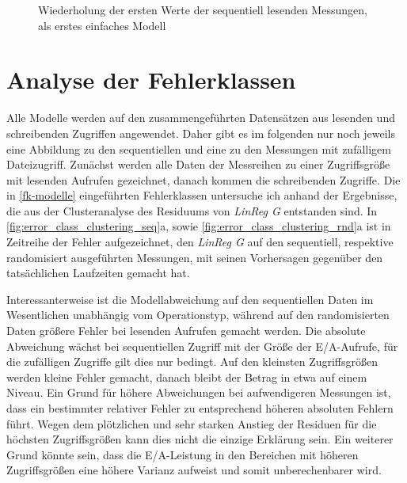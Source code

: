 \documentclass[
	12pt,
	a4paper,
	BCOR10mm,
	DIV14,
	listof=totoc,
	bibliography=totoc,
	headsepline
]{scrreprt}
\begin{document}
\begin{figure}
	\caption{Wiederholung der ersten Werte der sequentiell lesenden Messungen, als erstes einfaches Modell}
	\label{fig:periodicity100001}
\end{figure} 
\clearpage

\section{Analyse der Fehlerklassen}
\label{fk_analyse}
Alle Modelle werden auf den zusammengeführten Datensätzen aus lesenden und schreibenden Zugriffen angewendet. Daher gibt es im folgenden nur noch jeweils eine Abbildung zu den sequentiellen und eine zu den Messungen mit zufälligem Dateizugriff.
Zunächst werden alle Daten der Messreihen zu einer Zugriffsgröße mit lesenden Aufrufen gezeichnet, danach kommen die schreibenden Zugriffe. 
Die in \ref{fk-modelle} eingeführten Fehlerklassen untersuche ich anhand der Ergebnisse, die aus der Clusteranalyse des Residuums von \textit{LinReg G} entstanden sind.
In \ref{fig:error_class_clustering_seq}a, sowie \ref{fig:error_class_clustering_rnd}a ist in Zeitreihe der Fehler aufgezeichnet, den \textit{LinReg G} auf den sequentiell, respektive randomisiert ausgeführten Messungen, mit seinen Vorhersagen gegenüber den tatsächlichen Laufzeiten gemacht hat.

Interessanterweise ist die Modellabweichung auf den sequentiellen Daten im Wesentlichen unabhängig vom Operationstyp, während auf den randomisierten Daten größere Fehler bei lesenden Aufrufen gemacht werden.
Die absolute Abweichung wächst bei sequentiellen Zugriff mit der Größe der E/A-Aufrufe, für die zufälligen Zugriffe gilt dies nur bedingt. Auf den kleinsten Zugriffsgrößen werden kleine Fehler gemacht, danach bleibt der Betrag in etwa auf einem Niveau.
Ein Grund für höhere Abweichungen bei aufwendigeren Messungen ist, dass ein bestimmter relativer Fehler zu entsprechend höheren absoluten Fehlern führt.
Wegen dem plötzlichen und sehr starken Anstieg der Residuen für die höchsten Zugriffsgrößen kann dies nicht die einzige Erklärung sein.
Ein weiterer Grund könnte sein, dass die E/A-Leistung in den Bereichen mit höheren Zugriffsgrößen eine höhere Varianz aufweist und somit unberechenbarer wird.
\end{document}
